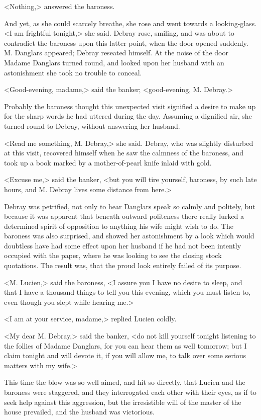 <Nothing,> answered the baroness. 

 And yet, as she could scarcely breathe, she rose and went towards a looking-glass. <I am frightful tonight,> she said. Debray rose, smiling, and was about to contradict the baroness upon this latter point, when the door opened suddenly. M. Danglars appeared; Debray reseated himself. At the noise of the door Madame Danglars turned round, and looked upon her husband with an astonishment she took no trouble to conceal. 

 <Good-evening, madame,> said the banker; <good-evening, M. Debray.> 

 Probably the baroness thought this unexpected visit signified a desire to make up for the sharp words he had uttered during the day. Assuming a dignified air, she turned round to Debray, without answering her husband. 

 <Read me something, M. Debray,> she said. Debray, who was slightly disturbed at this visit, recovered himself when he saw the calmness of the baroness, and took up a book marked by a mother-of-pearl knife inlaid with gold. 

 <Excuse me,> said the banker, <but you will tire yourself, baroness, by such late hours, and M. Debray lives some distance from here.> 

 Debray was petrified, not only to hear Danglars speak so calmly and politely, but because it was apparent that beneath outward politeness there really lurked a determined spirit of opposition to anything his wife might wish to do. The baroness was also surprised, and showed her astonishment by a look which would doubtless have had some effect upon her husband if he had not been intently occupied with the paper, where he was looking to see the closing stock quotations. The result was, that the proud look entirely failed of its purpose. 

 <M. Lucien,> said the baroness, <I assure you I have no desire to sleep, and that I have a thousand things to tell you this evening, which you must listen to, even though you slept while hearing me.> 

 <I am at your service, madame,> replied Lucien coldly. 

 <My dear M. Debray,> said the banker, <do not kill yourself tonight listening to the follies of Madame Danglars, for you can hear them as well tomorrow; but I claim tonight and will devote it, if you will allow me, to talk over some serious matters with my wife.> 

 This time the blow was so well aimed, and hit so directly, that Lucien and the baroness were staggered, and they interrogated each other with their eyes, as if to seek help against this aggression, but the irresistible will of the master of the house prevailed, and the husband was victorious. 

